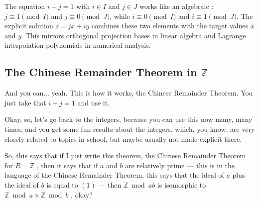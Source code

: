 \begin{aiNote}[Beyond the Lecture: The Equation $i + j = 1$ as a Partition of Unity]
The equation $i + j = 1$ with $i \in I$ and $j \in J$ works like an algebraic : $j \equiv 1 \pmod I$ and $j \equiv 0 \pmod J$, while $i \equiv 0 \pmod I$ and $i \equiv 1 \pmod J$. The explicit solution $z = jx + iy$ combines these two elements with the target values $x$ and $y$. This mirrors orthogonal projection bases in linear algebra and Lagrange interpolation polynomials in numerical analysis.
\end{aiNote}

\begin{hidden}
\end{hidden}

\subsection{The Chinese Remainder Theorem in \texorpdfstring{$\mathbb{Z}$}{Z}}

\begin{speech}[00:13:45 - 00:15:00]
And you can... yeah. This is how it works, the Chinese Remainder Theorem. You just take that $i + j = 1$ and use it. 

Okay, so, let's go back to the integers, because you can use this now many, many times, and you get some fun results about the integers, which, you know, are very closely related to topics in school, but maybe usually not made explicit there.

So, this says that if I just write this theorem, the Chinese Remainder Theorem for $R = \mathbb{Z}$ , then it says that if $a$ and $b$ are relatively prime  --- this is in the language of the Chinese Remainder Theorem, this says that the ideal of $a$ plus the ideal of $b$ is equal to $(1)$  --- then $\mathbb{Z} \bmod ab$ is isomorphic to $\mathbb{Z} \bmod a \times \mathbb{Z} \bmod b$ , okay?
\end{speech}

